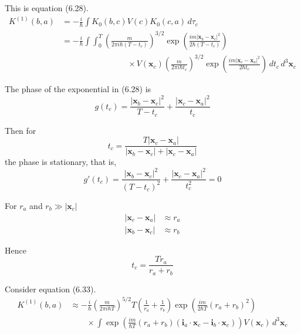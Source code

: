 


This is equation (6.28).
\begin{align*}
K^{(1)}(b,a)&=-\frac{i}{\hbar}\int K_0(b,c)V(c)K_0(c,a)\,d\tau_c
\\
&=-\frac{i}{\hbar}\int\int_0^T
\left(\frac{m}{2\pi i\hbar(T-t_c)}\right)^{3/2}
\exp\left(\frac{im|\mathbf x_b-\mathbf x_c|^2}{2\hbar(T-t_c)}\right)
\\
&\qquad\qquad\qquad\qquad{}\times V(\mathbf x_c)
\left(\frac{m}{2\pi i\hbar t_c}\right)^{3/2}
\exp\left(\frac{im|\mathbf x_c-\mathbf x_a|^2}{2\hbar t_c}\right)
\,dt_c\,d^3\mathbf x_c
\tag{6.28}
\end{align*}

The phase of the exponential in (6.28) is
\begin{equation*}
g(t_c)=
\frac{|\mathbf x_b-\mathbf x_c|^2}{T-t_c}
+
\frac{|\mathbf x_c-\mathbf x_a|^2}{t_c}
\end{equation*}

Then for
\begin{equation*}
t_c=\frac{T|\mathbf x_c-\mathbf x_a|}{|\mathbf x_b-\mathbf x_c|+|\mathbf x_c-\mathbf x_a|}
\end{equation*}
the phase is stationary, that is,
\begin{equation*}
g'(t_c)=
\frac{|\mathbf x_b-\mathbf x_c|^2}{(T-t_c)^2}
+
\frac{|\mathbf x_c-\mathbf x_a|^2}{t_c^2}
=0
\end{equation*}

For $r_a$ and $r_b\gg|\mathbf x_c|$
\begin{align*}
|\mathbf x_c-\mathbf x_a|&\approx r_a %
\\
|\mathbf x_b-\mathbf x_c|&\approx r_b %
\end{align*}

Hence
\begin{equation*}
t_c=\frac{Tr_a}{r_a+r_b}
\end{equation*}



Consider equation (6.33).
\begin{align*}
K^{(1)}(b,a)&\approx
-\frac{i}{\hbar}
\left(\frac{m}{2\pi i\hbar T}\right)^{5/2}
T
\left(\frac{1}{r_a}+\frac{1}{r_b}\right)
\exp\left(\frac{im}{2\hbar T}(r_a+r_b)^2\right)
\\
&\qquad{}\times\int
\exp\left(\frac{im}{\hbar T}(r_a+r_b)(\mathbf i_a\cdot\mathbf x_c-\mathbf i_b\cdot\mathbf x_c)\right)
V(\mathbf x_c)
\,d^3\mathbf x_c
\end{align*}


